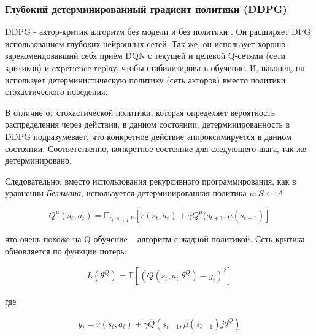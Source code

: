 \subsubsection{Глубокий детерминированный градиент политики (DDPG)}

\hyperref[acr:ddpg]{DDPG} - актор-критик алгоритм без модели и без политики \cite{lillicrap2015continuous}. Он расширяет \hyperref[acr:dpg]{DPG} использованием глубоких нейронных сетей. Так же, он использует хорошо зарекомендовавший себя приём DQN с текущей и целевой Q-сетями (сети критиков) и experience replay, чтобы стабилизировать обучение. И, наконец, он использует детерминистическую политику (сеть акторов) вместо политики стохастического поведения.

В отличие от стохастической политики, которая определяет вероятность распределения через действия, в данном состоянии, детерминированность в DDPG подразумевает, что конкретное действие аппроксимируется в данном состоянии. Соответственно, конкретное состояние для следующего шага, так же детерминировано.

Следовательно, вместо использования рекурсивного программирования, как в уравнении {\itshape Беллмана}, используется детерминированная политика $\mu : S \leftarrow A$ \cite{lillicrap2015continuous}

\begin{equation}
	\label{eq:ch1-ddpg-1}
	\begin{multlined}
		Q^\mu (s_t, a_t) = \mathbb{E}_{r_t, s_{t+1}~E}[r(s_t, a_t) + \gamma Q^\mu(s_{t+1}, \mu(s_{t+1})]
	\end{multlined}
\end{equation}

что очень похоже на Q-обучение – алгоритм с жадной политикой. Сеть критика обновляется по функции потерь:

\begin{equation}
	\label{eq:ch1-ddpg-1}
	\begin{multlined}
		L(\theta^Q) = \mathbb{E}[(Q(s_t, a_t|\theta^Q) - y_t)^2]
	\end{multlined}
\end{equation}

где

\begin{equation}
	\label{eq:ch1-ddpg-3}
	\begin{multlined}
		y_t = r(s_t, a_t) + \gamma Q(s_{t+1}, \mu(s_{t+1})j\theta^Q)
	\end{multlined}
\end{equation}


